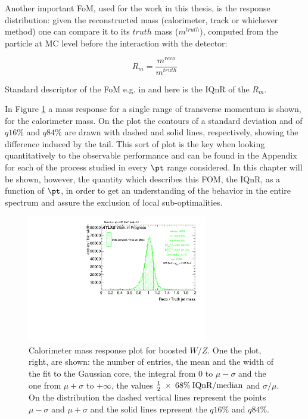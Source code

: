 Another important FoM, used for the work in this thesis, is the response distribution: given the reconstructed mass (calorimeter, track or whichever method) one can compare it to its $truth$ mass ($m^{truth}$), computed from the particle at MC level before the interaction with the detector:

$$R_m=\frac{m^{reco}}{m^{truth}}$$

Standard descriptor of the FoM e.g. in \cite{art35} and here is the IQnR of the $R_m$.
  
  
In Figure \ref{fig:iqrbin} a mass response for a single range of transverse momentum is shown, for the calorimeter mass. On the plot the contours of a standard deviation and of $q16\%$ and $q84\%$ are drawn with dashed and solid lines, respectively, showing the difference induced by the tail. This sort of plot is the key when looking quantitatively to the observable performance and can be found in the Appendix for each of the process studied in every $\pt$ range considered. In this chapter will be shown, however, the quantity which describes this FOM, the IQnR, as a function of $\pt$, in order to get an understanding of the behavior in the entire spectrum and assure the exclusion of local sub-optimalities.

\begin{figure}[!ht]
  \centering
      \includegraphics[width=0.7\textwidth]{jet_part/8ResponsePTJ_h_JetRatio_mJ05CALO.pdf}
  \caption[$\mcal$ response single $\pt$ bin]{Calorimeter mass response plot for boosted $W/Z$. One the plot, right, are shown: the number of entries, the mean and the width of the fit to the Gaussian core, the integral from 0 to $\mu-\sigma$ and the one from $\mu+\sigma$ to $+\infty$, the values $\frac{1}{2}\: \times\: 68\% \:\textrm{IQnR/median}$ and $\sigma/\mu$. On the distribution the dashed vertical lines represent the points $\mu-\sigma$ and $\mu+\sigma$ and the solid lines represent the $q16\%$ and $q84\%$.}
  \label{fig:iqrbin}
\end{figure}